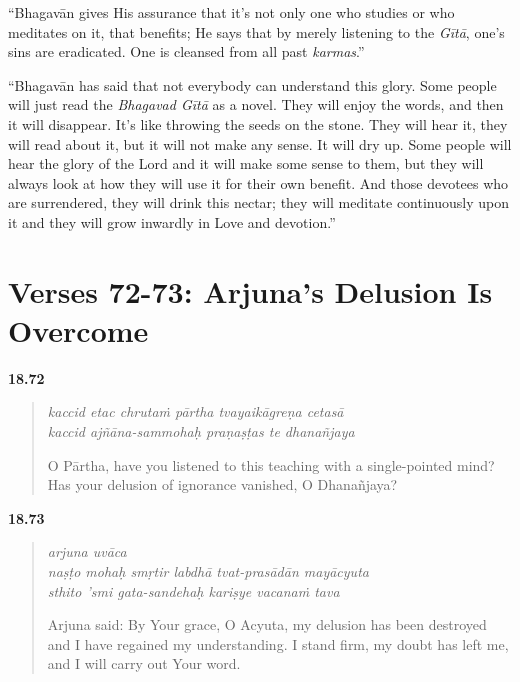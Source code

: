 \enquote{Bhagavān gives His assurance that it’s not only one who studies or who meditates on it, that benefits; He says that by merely listening to the \textit{Gītā}, one’s sins are eradicated. One is cleansed from all past \textit{karmas}.}

\enquote{Bhagavān has said that not everybody can understand this glory. Some people will just read the \textit{Bhagavad Gītā} as a novel. They will enjoy the words, and then it will disappear. It’s like throwing the seeds on the stone. They will hear it, they will read about it, but it will not make any sense. It will dry up. Some people will hear the glory of the Lord and it will make some sense to them, but they will always look at how they will use it for their own benefit. And those devotees who are surrendered, they will drink this nectar; they will meditate continuously upon it and they will grow inwardly in Love and devotion.}

\newpage
\section{Verses 72-73: Arjuna's Delusion Is Overcome}\label{sec-verses-72-73-arjuna-s-delusion-is-overcome}


\par\noindent\textbf{18.72}\par
\begin{verse}
\textit{kaccid etac chrutaṁ pārtha tvayaikāgreṇa cetasā} \\
\textit{kaccid ajñāna-sammohaḥ praṇaṣṭas te dhanañjaya}

\noindent O Pārtha, have you listened to this teaching with a single-pointed mind? Has your delusion of ignorance vanished, O Dhanañjaya?
\end{verse}
\par



\par\noindent\textbf{18.73}\par
\begin{verse}
\textit{arjuna uvāca} \\
\textit{naṣṭo mohaḥ smṛtir labdhā tvat-prasādān mayācyuta} \\
\textit{sthito ’smi gata-sandehaḥ kariṣye vacanaṁ tava}

\noindent Arjuna said: By Your grace, O Acyuta, my delusion has been destroyed and I have regained my understanding. I stand firm, my doubt has left me, and I will carry out Your word.
\end{verse}
\par


